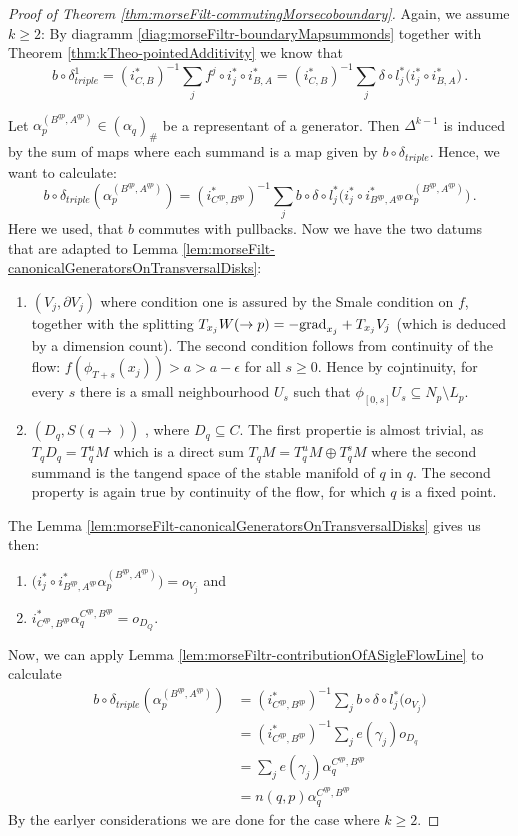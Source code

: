 \begin{proof}[Proof of Theorem \ref{thm:morseFilt-commutingMorsecoboundary}]
Again, we assume $k\geq2 $: By diagramm \ref{diag:morseFiltr-boundaryMapsummonds} together with Theorem \ref{thm:kTheo-pointedAdditivity} we know that 
		 \begin{equation*}
			b \circ \delta^1_{triple}=(i^*_{C,B})^{-1} \sum_j f^j\circ i_j^*\circ i_{B,A}^*=(i^*_{C,B})^{-1} \sum_j \delta\circ l_j^*\big(i_j^*\circ i_{B,A}^*\big)\,.
		 \end{equation*}

Let $\alpha_p^{(B^{qp},A^{qp})}\in (\alpha_q)_{\#}$ be a representant of a generator. Then $\Delta^{k-1}$ is induced by the sum of maps where each summand is a map given by $b\circ \delta_{triple}$. 
 Hence, we want to calculate:
 \begin{equation*}
	b\circ \delta_{triple}(\alpha_p^{(B^{qp},A^{qp})})=(i^*_{C^{qp},B^{qp}})^{-1} \sum_j b\circ \delta\circ l_j^*\big(i_j^*\circ i_{B^{qp},A^{qp}}^*\alpha_p^{(B^{qp},A^{qp})}\big)\,.
 \end{equation*}Here we used, that $b$ commutes with pullbacks.
Now we have the two datums that are adapted to Lemma \ref{lem:morseFilt-canonicalGeneratorsOnTransversalDisks}:
\begin{enumerate}
	\item $(V_j,\partial V_j)$ where condition one is assured by the Smale condition on $f$, together with the splitting $T_{x_j}W(\to p)=-\mathrm{grad}_{x_j}+ T_{x_j}V_j $ (which is deduced by a dimension count). The second condition follows from continuity of the flow: $f(\phi_{T+s}(x_j))>a>a-\epsilon$ for all $s\geq 0$. Hence by cojntinuity, for every $s$ there is a small neighbourhood $U_s$ such that $\phi_[0,s]U_s\subseteq N_p\setminus L_p$.
	\item $(D_q,S(q\to))$ , where $D_q\subseteq C$. The first propertie is almost trivial, as $T_qD_q=T^u_qM$ which is a direct sum $T_qM=T_q^uM\oplus T^s_qM$ where the second summand is the tangend space of the stable manifold of $q$ in $q$. The second property is again true by continuity of the flow, for which $q$ is a fixed point. 
\end{enumerate}
The Lemma \ref{lem:morseFilt-canonicalGeneratorsOnTransversalDisks} gives us then: 
\begin{enumerate}
	\item $\big(i_j^*\circ i_{B^{qp},A^{qp}}^*\alpha_p^{(B^{qp},A^{qp})}\big)=o_{V_j}$ and
	\item $i^*_{C^{qp},B^{qp}}\alpha_q^{C^{qp},B^{qp}}=o_{D_Q}$.
\end{enumerate} Now, we can apply Lemma \ref{lem:morseFiltr-contributionOfASigleFlowLine} to calculate
\begin{align*}
	b\circ \delta_{triple}(\alpha_p^{(B^{qp},A^{qp})})
	&=(i^*_{C^{qp},B^{qp}})^{-1} \sum_j b\circ \delta\circ l_j^*\big(o_{V_j}\big)\\
	&=(i^*_{C^{qp},B^{qp}})^{-1} \sum_j e(\gamma_j)o_{D_q}\\
	&=\sum_j e(\gamma_j) \alpha_q^{C^{qp},B^{qp}}\\
	&=n(q,p) \alpha_q^{C^{qp},B^{qp}}
\end{align*}
By the earlyer considerations we are done for the case where $k\geq 2$. 



\end{proof}
